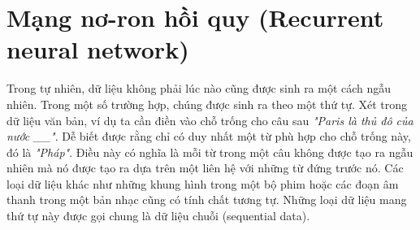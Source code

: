 




\section{Mạng nơ-ron hồi quy (Recurrent neural network)}

Trong tự nhiên, dữ liệu không phải lúc nào cũng được sinh ra một cách ngẫu nhiên. Trong một số trường hợp, chúng được sinh ra theo một thứ tự. Xét trong dữ liệu văn bản, ví dụ ta cần điền vào chỗ trống cho câu sau \textit{"Paris là thủ đô của nước \_\_"}. Dễ biết được rằng chỉ có duy nhất một từ phù hợp cho chỗ trống này, đó là \textit{"Pháp"}. Điều này có nghĩa là mỗi từ trong một câu không được tạo ra ngẫu nhiên mà nó được tạo ra dựa trên một liên hệ với những từ đứng trước nó. Các loại dữ liệu khác như những khung hình trong một bộ phim hoặc các đoạn âm thanh trong một bản nhạc cũng có tính chất tương tự. Những loại dữ liệu mang thứ tự này được gọi chung là dữ liệu chuỗi (sequential data).

